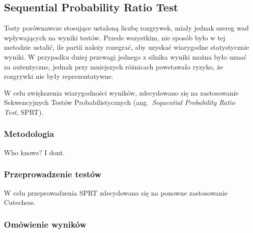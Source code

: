 
\subsection{Sequential Probability Ratio Test}
\label{subsec:sequential-probability-ratio-test}
Testy porównawcze stosujące ustaloną liczbę rozgrywek, miały jednak szereg wad wpływających na wyniki testów.
Przede wszystkim, nie sposób było w tej metodzie ustalić, ile partii należy rozegrać, aby uzyskać wiarygodne statystycznie wyniki.
W przypadku dużej przewagi jednego z silnika wyniki można było uznać za autentyczne, jednak przy mniejszych różnicach powstawało ryzyko, że rozgrywki nie były reprezentatywne.

W celu zwiększenia wiarygodności wyników, zdecydowano się na zastosowanie Sekwencyjnych Testów Probabilistycznych (ang.\ \emph{Sequential Probability Ratio Test}, SPRT).
\subsubsection{Metodologia}
    Who knows? I dont.
\subsubsection{Przeprowadzenie testów}
    W celu przeprowadzenia SPRT zdecydowano się na ponowne zastosowanie Cutechess.
\subsubsection{Omówienie wyników}